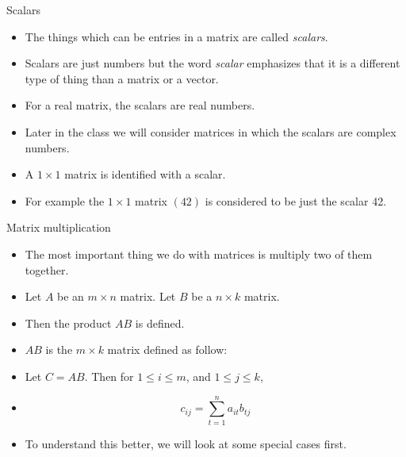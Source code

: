 \documentclass{beamer}
\begin{document}


\begin{frame}{Scalars}

\begin{itemize}
\item The things which can be entries in a matrix are called \emph{scalars}.
\item Scalars are just numbers but the word \emph{scalar} emphasizes that it
is a different type of thing than a matrix or a vector.
\item For a real matrix, the scalars are real numbers.
\item Later in the class we will consider matrices in which the scalars
are complex numbers.
\item A $1\times 1$ matrix is identified with a scalar.
\item For example the $1\times 1$ matrix $(42)$ is considered to
be just the scalar 42.
\end{itemize}

\end{frame}


\begin{frame}{Matrix multiplication}

\begin{itemize}
\item The most important thing we do with matrices is multiply two of
them together.
\item Let $A$ be an $m\times n$ matrix. Let $B$ be a $n\times k$ matrix.
\item Then the product $A B$ is defined.
\item $A B$ is the $m\times k$ matrix defined as follow:
\item Let $C=A B$. Then for $1\leq i \leq m$, and $1\leq j \leq k$,
\item $$c_{ij} = \sum_{t=1}^n a_{it} b_{tj}$$
\item To understand this better, we will look at some special cases first.
\end{itemize}

\end{frame}

\end{document}
